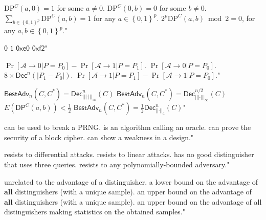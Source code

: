 {$\text{DP}^C(a,0) = 1$ for some $a \neq 0$.}
{$\text{DP}^C(0,b) = 0$ for some $b \neq 0$.}
{$\sum_{b \in \left\{ 0,1 \right\}^p}\text{DP}^C(a,b) = 1$ for any $a\in \left\{ 0,1 \right\}^p$.}
{$2^p \text{DP}^C(a,b) \bmod 2 = 0$, for any $a,b\in \left\{ 0,1 \right\}^p$."}

{$\mathsf{0}$}
{$\mathsf{1}$}
{$\mathsf{0xe0}$}
{$\mathsf{0xf2}$"}

{$\Pr[\mathcal{A} \rightarrow 0 | P = P_0] - \Pr[\mathcal{A} \rightarrow 1 | P = P_1]$.}
{$\Pr[\mathcal{A} \rightarrow 0 | P = P_0]$.}
{$8 \times \mathsf{Dec}^n(|P_1-P_0|)$.}
{$\Pr[\mathcal{A} \rightarrow 1 | P = P_1] - \Pr[\mathcal{A} \rightarrow 1 | P = P_0]$."}

{$\mathsf{BestAdv}_n(C,C^\ast)=\mathsf{Dec}^n_{\left|\left|\left|\cdot\right|\right|\right|_\infty}(C)$}
{$\mathsf{BestAdv}_n(C,C^\ast)=\mathsf{Dec}^{n/2}_{\left|\left|\left|\cdot\right|\right|\right|_\infty}(C)$}
{$E(\mathsf{DP}^{C}(a,b)) < \frac{1}{2}$}
{$\mathsf{BestAdv}_n(C,C^\ast)=\frac{1}{2}\mathsf{Dec}^n_{\left|\left|\cdot\right|\right|_a}(C)$"}

{can be used to break a PRNG.}
{is an algorithm calling an oracle.}
{can prove the security of a block cipher.}
{can show a weakness in a design."}

{resists to differential attacks.}
{resists to linear attacks.}
{has no good distinguisher that uses three queries.}
{resists to any polynomially-bounded adversary."}

{unrelated to the advantage of a distinguisher.}
{a lower bound on the advantage of $ \textbf{all} $ distinguishers (with a unique sample).}
{an upper bound on the advantage of $ \textbf{all} $ distinguishers (with a unique sample).}
{an upper bound on the advantage of all distinguishers making statistics on the obtained samples."}

